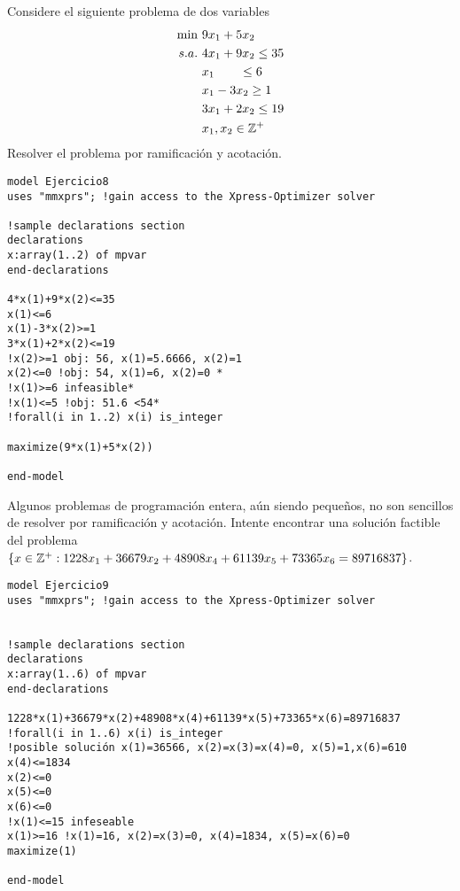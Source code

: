 \documentclass[twoside]{article}
\begin{document}
\newpage

\begin{ejercicio}{8}
Considere el siguiente problema de dos variables
\begin{align*}
\min\ & 9x_1+5x_2\\
s.a.\   & 4x_1+9x_2\leq 35\\
       & x_1\qquad\leq 6\\
       & x_1-3x_2\geq 1\\
       & 3x_1+2x_2\leq 19\\
       & x_1,x_2\in\mathbb{Z}^+
\end{align*}
Resolver el problema por ramificación y acotación.
\end{ejercicio}
\begin{solucion}
\begin{verbatim}
model Ejercicio8
uses "mmxprs"; !gain access to the Xpress-Optimizer solver

!sample declarations section
declarations
x:array(1..2) of mpvar
end-declarations

4*x(1)+9*x(2)<=35
x(1)<=6
x(1)-3*x(2)>=1
3*x(1)+2*x(2)<=19
!x(2)>=1 obj: 56, x(1)=5.6666, x(2)=1
x(2)<=0 !obj: 54, x(1)=6, x(2)=0 *
!x(1)>=6 infeasible*
!x(1)<=5 !obj: 51.6 <54*
!forall(i in 1..2) x(i) is_integer

maximize(9*x(1)+5*x(2))

end-model
\end{verbatim}
\end{solucion}

\newpage

\begin{ejercicio}{9}
Algunos problemas de programación entera, aún siendo pequeños, no son sencillos de resolver por ramificación y acotación. Intente encontrar una solución factible del problema $\{x\in\mathbb{Z}^+: 1228x_1+36679x_2+48908x_4+61139x_5+73365x_6=89716837\}$.
\end{ejercicio}
\begin{solucion}
\begin{verbatim}
model Ejercicio9
uses "mmxprs"; !gain access to the Xpress-Optimizer solver


!sample declarations section
declarations
x:array(1..6) of mpvar
end-declarations

1228*x(1)+36679*x(2)+48908*x(4)+61139*x(5)+73365*x(6)=89716837
!forall(i in 1..6) x(i) is_integer
!posible solución x(1)=36566, x(2)=x(3)=x(4)=0, x(5)=1,x(6)=610
x(4)<=1834
x(2)<=0
x(5)<=0
x(6)<=0
!x(1)<=15 infeseable
x(1)>=16 !x(1)=16, x(2)=x(3)=0, x(4)=1834, x(5)=x(6)=0
maximize(1)

end-model
\end{verbatim}
\end{solucion}
\end{document}
